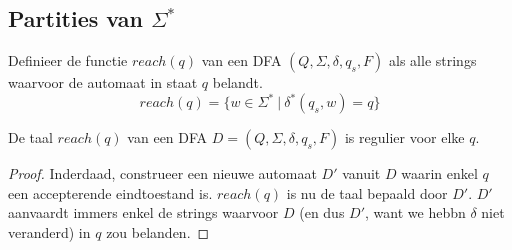 \documentclass[main.tex]{subfiles}
\begin{document}
\subsection{Partities van $\Sigma^{*}$}
\label{sec:partities-van-sigma-ster}

\begin{de}
  Definieer de functie $reach(q)$ van een DFA $(Q,\Sigma,\delta,q_{s},F)$ als alle strings waarvoor de automaat in staat $q$ belandt.
  \[
  reach(q) = \{ w \in \Sigma^{*}\ |\ \delta^{*}(q_{s},w) = q \}
  \]
\end{de}

\begin{st}
  De taal $reach(q)$ van een DFA $D = (Q,\Sigma,\delta,q_{s},F)$ is regulier voor elke $q$.
  
  \begin{proof}
    Inderdaad, construeer een nieuwe automaat $D'$ vanuit $D$ waarin enkel $q$ een accepterende eindtoestand is.
    $reach(q)$ is nu de taal bepaald door $D'$. $D'$ aanvaardt immers enkel de strings waarvoor $D$ (en dus $D'$, want we hebbn $\delta$ niet veranderd) in $q$ zou belanden.
  \end{proof}
\end{st}
\end{document}
